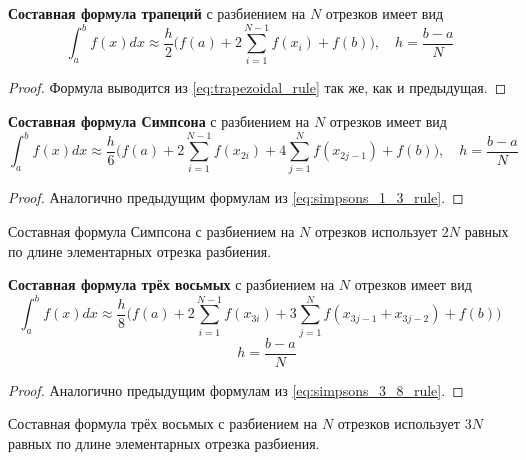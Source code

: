 \documentclass[../main.tex]{subfile}
\begin{document}
\begin{theorem}
	\textbf{Составная формула трапеций} с разбиением на $N$ отрезков имеет вид
	\[\boxed{\int_a^b f(x)dx\approx \frac{h}{2}\Big(f(a)+2\sum_{i=1}^{N-1}
	f(x_i)+f(b)\Big),\quad h=\frac{b-a}{N}}\]
\end{theorem}

\begin{proof}
	Формула выводится из \eqref{eq:trapezoidal_rule} так же, как и
	предыдущая.
\end{proof}

\begin{theorem}
	\textbf{Составная формула Симпсона} с разбиением на $N$ отрезков имеет вид
	\[\boxed{\int_a^b f(x)dx\approx \frac{h}{6}\Big(f(a)+2\sum_{i=1}^{N-1}
	f(x_{2i})+4\sum_{j=1}^{N}f(x_{2j-1})+f(b)\Big),\quad h=\frac{b-a}{N}}\]
\end{theorem}

\begin{proof}
	Аналогично предыдущим формулам из \eqref{eq:simpsons_1_3_rule}.
\end{proof}

\begin{remark}
	Составная формула Симпсона с разбиением на $N$ отрезков использует $2N$
	равных по длине элементарных отрезка разбиения.
\end{remark}

\begin{theorem}
	\textbf{Составная формула трёх восьмых} с разбиением на $N$ отрезков
	имеет вид
	\[\boxed{\int_a^b f(x)dx\approx \frac{h}{8}\Big(f(a)+2\sum_{i=1}^{N-1}
	f(x_{3i})+3\sum_{j=1}^{N}f(x_{3j-1}+x_{3j-2})+f(b)\Big)}\]
	\[\quad h=\frac{b-a}{N}\]
\end{theorem}

\begin{proof}
	Аналогично предыдущим формулам из \eqref{eq:simpsons_3_8_rule}.
\end{proof}

\begin{remark}
	Составная формула трёх восьмых с разбиением на $N$ отрезков использует
	$3N$
	равных по длине элементарных отрезка разбиения.
\end{remark}


\end{document}
